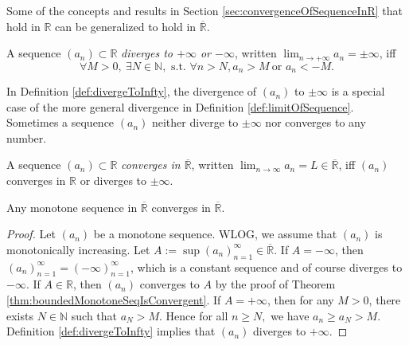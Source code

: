 \begin{rem}
  Some of the concepts and results in Section
  \ref{sec:convergenceOfSequenceInR}
  that hold in $\mathbb{R}$
  can be generalized to hold in $\overline{\mathbb{R}}$. 
\end{rem}

\begin{defn}
  \label{def:divergeToInfty}
  A sequence $(a_n)\subset \mathbb{R}$
  \emph{diverges to $+\infty$ or $-\infty$},
  written $\lim_{n\rightarrow +\infty} a_n = \pm \infty$,
  iff
  \begin{equation}
    \label{eq:divergeToInfty}
    \forall M>0,\ \exists N\in \mathbb{N},\text{ s.t. }
    \forall n>N, a_{n}>M\ \text{or }a_{n}<-M.
  \end{equation}
\end{defn}

\begin{rem}
  In Definition \ref{def:divergeToInfty},
  the divergence of $(a_n)$ to $\pm \infty$
  is a special case of the more general divergence
  in Definition \ref{def:limitOfSequence}. 
  Sometimes a sequence $(a_n)$ neither diverge to $\pm \infty$
  nor converges to any number.  
\end{rem}

\begin{defn}
  \label{def:limitOfSequenceInRclosure}
  A sequence $(a_n)\subset \mathbb{R}$
  \emph{converges in $\overline{\mathbb{R}}$},
  written $\lim_{n\rightarrow \infty} a_n = L\in \overline{\mathbb{R}}$,
  iff $(a_{n})$ converges in $\mathbb{R}$ or
  diverges to $\pm \infty$. 
\end{defn}

\begin{thm}
  \label{thm:monotoneSubsequenceInR*}
  Any monotone sequence in $\overline{\mathbb{R}}$ converges in $\overline{\mathbb{R}}$.
\end{thm}
\begin{proof}
  Let $(a_{n})$ be a monotone sequence.
  WLOG, we assume that $(a_{n})$ is monotonically increasing.
  Let $A:=\sup(a_{n})_{n=1}^{\infty}\in \overline{\mathbb{R}}. $
  If $A=-\infty$, then $(a_{n})_{n=1}^{\infty}=(-\infty)_{n=1}^{\infty}$,
  which is a constant sequence and of course diverges to $-\infty$.
  If $A\in \mathbb{R}$, then $(a_{n})$ converges to $A$ by the proof of
  Theorem \ref{thm:boundedMonotoneSeqIsConvergent}.
  If $A=+\infty$, then for any $M>0$,
  there exists $N\in \mathbb{N}$ such that $a_{N}>M$.
  Hence for all $n\ge N,$ we have $a_{n}\ge a_{N}>M$.
  Definition \ref{def:divergeToInfty} implies
  that $(a_{n})$ diverges to $+\infty$.
\end{proof}

